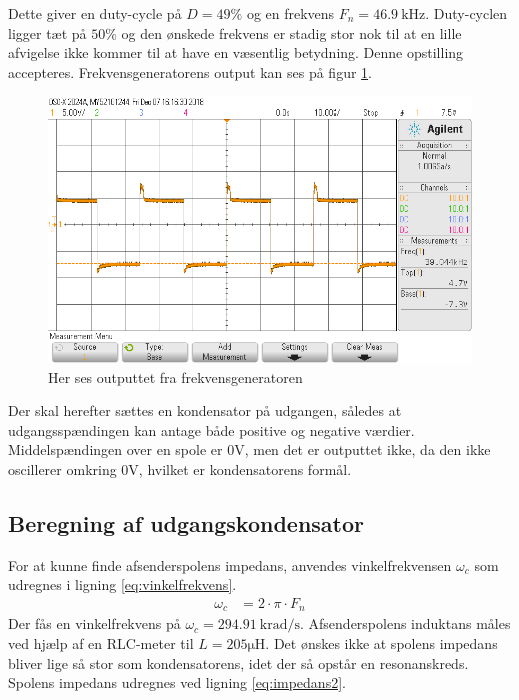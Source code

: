 Dette giver en duty-cycle på $D = 49\%$ og en frekvens $F_n = \SI{46.9}{\kilo\hertz}$. 
Duty-cyclen ligger tæt på $50\%$ og den ønskede frekvens er stadig stor nok til at en lille afvigelse ikke kommer til at have en væsentlig betydning. Denne opstilling accepteres. Frekvensgeneratorens output kan ses på figur \ref{fig:frekvensgenerator_output}.
\begin{figure}[h!]
	\centering
	\includegraphics[width=1\textwidth]{billeder/freq_png.png}
	\caption{Her ses outputtet fra frekvensgeneratoren}
	\label{fig:frekvensgenerator_output}
\end{figure}

Der skal herefter sættes en kondensator på udgangen, således at udgangsspændingen kan antage både positive og negative værdier. 
Middelspændingen over en spole er $0\si{\volt}$, men det er outputtet ikke, da den ikke oscillerer omkring $0 \si{\volt}$, hvilket er kondensatorens formål. 
\subsection{Beregning af udgangskondensator}
For at kunne finde afsenderspolens impedans, anvendes vinkelfrekvensen $\omega_c$ som udregnes i ligning \ref{eq:vinkelfrekvens}.
\begin{align}
	\omega_c & = 2 \cdot \pi \cdot F_n \label{eq:vinkelfrekvens}
\end{align}
Der fås en vinkelfrekvens på $\omega_c = \SI{294.91}{\kilo\radian\per\second}$.
Afsenderspolens induktans måles ved hjælp af en RLC-meter til $L = 205\si{\micro \henry}$.
Det ønskes ikke at spolens impedans bliver lige så stor som kondensatorens, idet der så opstår en resonanskreds. 
Spolens impedans udregnes ved ligning \ref{eq:impedans2}.

